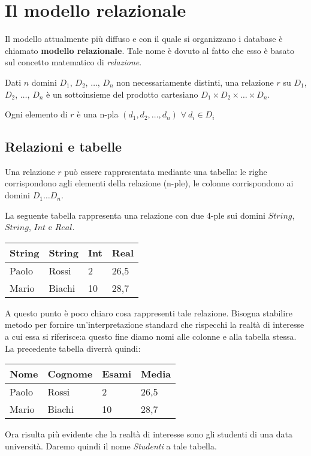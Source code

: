 \section{Il modello relazionale}
Il modello attualmente più diffuso e con il quale si organizzano i database è chiamato
\textbf{modello relazionale}. Tale nome è dovuto al fatto che esso è basato sul
concetto matematico di \emph{relazione}.
\begin{defn}
 Dati $n$ domini $D_1$, $D_2$, $\ldots$, $D_n$ non necessariamente distinti, una 
 relazione $r$ su $D_1$, $D_2$, $\ldots$, $D_n$ è un sottoinsieme del prodotto cartesiano
 $D_1 \times D_2 \times \ldots \times D_n$.
\end{defn}
Ogni elemento di $r$ è una n-pla $(d_1, d_2, \ldots, d_n)$  $\forall \ d_i \in D_i$

\subsection{Relazioni e tabelle}
Una relazione $r$ può essere rappresentata mediante una tabella: le righe corrispondono
agli elementi della relazione (n-ple), le colonne corrispondono ai domini $D_1\ldots D_n$.

\begin{exmp}
La seguente tabella rappresenta una relazione con due 4-ple sui domini $String$, $String$, 
$Int$ e $Real$.
 \begin{center}
  \begin{tabular}{llll}
    String & String & Int & Real\\
    \hline
    Paolo & Rossi & 2 & 26,5\\
    Mario & Biachi & 10 & 28,7
  \end{tabular}
 \end{center}
 A questo punto è poco chiaro cosa rappresenti tale relazione. Bisogna stabilire metodo per
 fornire un'interpretazione standard che rispecchi la realtà di interesse a cui essa si 
 riferisce:a questo fine diamo nomi alle colonne e alla tabella stessa. La precedente tabella
 diverrà quindi:

\begin{center}
  \begin{tabular}{l | l | l | l}
    Nome & Cognome & Esami & Media\\
    \hline
    Paolo & Rossi & 2 & 26,5\\
    Mario & Biachi & 10 & 28,7
  \end{tabular}
 \end{center}
 Ora risulta più evidente che la realtà di interesse sono gli studenti di una data università. 
 Daremo quindi il nome \emph{Studenti} a tale tabella.
\end{exmp}

